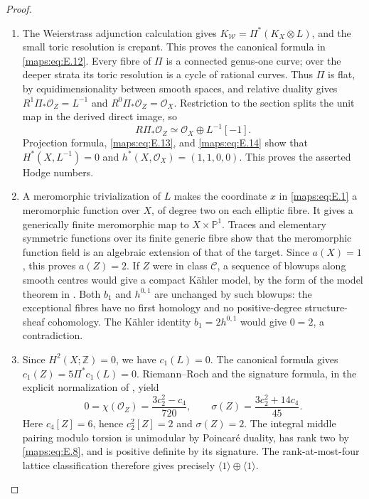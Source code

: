 \documentclass[11pt,a4paper]{article}
\numberwithin{equation}{section}
\theoremstyle{definition}
\begin{document}
\begin{proof}
\begin{enumerate}[label=\arabic*.,leftmargin=*]
\item The Weierstrass adjunction calculation gives
$K_{\mathscr W}=\Pi^*(K_X\otimes L)$, and the small toric
resolution is crepant.  This proves the canonical formula in
\eqref{maps:eq:E.12}.  Every fibre of $\Pi$ is a connected genus-one curve;
over the deeper strata its toric resolution is a cycle of rational
curves.  Thus $\Pi$ is flat, by equidimensionality between smooth
spaces, and relative duality gives
$R^1\Pi_*\mathcal O_Z=L^{-1}$ and
$R^0\Pi_*\mathcal O_Z=\mathcal O_X$.
Restriction to the section splits the unit map in the derived
direct image, so
\[
 R\Pi_*\mathcal O_Z\simeq
 \mathcal O_X\oplus L^{-1}[-1].
\]
Projection formula, \eqref{maps:eq:E.13}, and \eqref{maps:eq:E.14} show that
$H^*(X,L^{-1})=0$ and $h^*(X,\mathcal O_X)=(1,1,0,0)$.
This proves the asserted Hodge numbers.

\item A meromorphic trivialization of $L$ makes the coordinate $x$ in
\eqref{maps:eq:E.1} a meromorphic function over $X$, of degree two on each
elliptic fibre.  It gives a generically finite meromorphic map to
$X\times\mathbb P^1$.  Traces and elementary symmetric functions
over its finite generic fibre show that the meromorphic function
field is an algebraic extension of that of the target.  Since
$a(X)=1$, this proves $a(Z)=2$.  If $Z$ were in class
$\mathcal C$, a sequence of blowups along smooth centres would
give a compact K\"ahler model, by the form of the model theorem
in \cite[Theorem 1.1 and Remark 1.2]{ffJiaMeng}.
Both $b_1$ and $h^{0,1}$ are unchanged by such blowups: the
exceptional fibres have no first homology and no positive-degree
structure-sheaf cohomology.  The K\"ahler identity
$b_1=2h^{0,1}$ would give $0=2$, a contradiction.

\item Since $H^2(X;\mathbb Z)=0$, we have $c_1(L)=0$.
The canonical formula gives $c_1(Z)=5\Pi^*c_1(L)=0$.
Riemann--Roch and the signature
formula, in the explicit normalization of
\cite[(1.2)--(1.4)]{ffEsoleKang}, yield
\[
 0=\chi(\mathcal O_Z)=\frac{3c_2^2-c_4}{720},\qquad
 \sigma(Z)=\frac{3c_2^2+14c_4}{45}.
\]
Here $c_4[Z]=6$, hence $c_2^2[Z]=2$ and $\sigma(Z)=2$.
The integral middle pairing modulo torsion is unimodular by
Poincar\'e duality, has rank two by \eqref{maps:eq:E.8}, and is positive definite
by its signature.  The rank-at-most-four lattice classification
\cite[Theorem 2.2.1]{ffPetersSterk} therefore gives precisely
$\langle1\rangle\oplus\langle1\rangle$.
\end{enumerate}
\end{proof}
\end{document}
